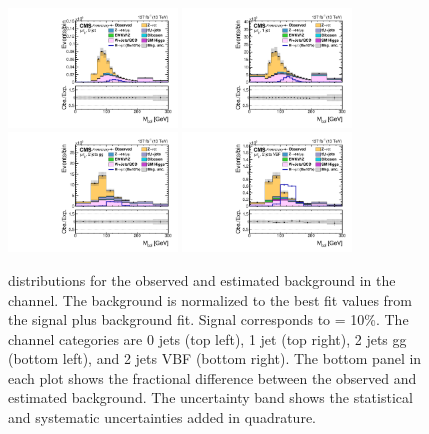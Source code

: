 \begin{figure}[htbp!]
  \centering
  \includegraphics[width=0.4\textwidth]{plots/chapter9/CB/mutau/0jet.pdf}
  \includegraphics[width=0.4\textwidth]{plots/chapter9/CB/mutau/1jet.pdf} \\
  \includegraphics[width=0.4\textwidth]{plots/chapter9/CB/mutau/2jet_gg.pdf}
  \includegraphics[width=0.4\textwidth]{plots/chapter9/CB/mutau/2jet_vbf.pdf} \\
  \caption{\mcol distributions for the observed and estimated background in the \muhad channel. The background is normalized to the best fit values from the signal plus background fit. Signal corresponds to \BHmt = 10\%. The \muhad channel categories are 0 jets (top left), 1 jet (top right), 2 jets gg (bottom left), and 2 jets VBF (bottom right). The bottom panel in each plot shows the fractional difference between the observed and estimated background. The uncertainty band shows the statistical and systematic uncertainties added in quadrature.}
  \label{fig:mcol_muhad}
\end{figure}

